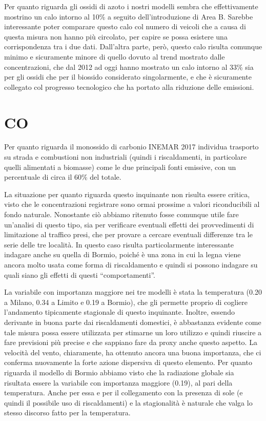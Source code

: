 \documentclass[a4paper]{report}
\begin{document}
Per quanto riguarda gli ossidi di azoto i nostri modelli sembra che effettivamente mostrino un calo intorno al 10\% a seguito dell'introduzione di Area B. Sarebbe interessante poter comparare questo calo col numero di veicoli che a causa di questa misura non hanno più circolato, per capire se possa esistere una corrispondenza tra i due dati. Dall'altra parte, però, questo calo risulta comunque minimo e sicuramente minore di quello dovuto al trend mostrato dalle concentrazioni, che dal 2012 ad oggi hanno mostrato un calo intorno al 33\% sia per gli ossidi che per il biossido considerato singolarmente, e che è sicuramente collegato col progresso tecnologico che ha portato alla riduzione delle emissioni.

\section{CO}
Per quanto riguarda il monossido di carbonio INEMAR 2017 individua trasporto su strada e combustioni non industriali (quindi i riscaldamenti, in particolare quelli alimentati a biomasse) come le due principali fonti emissive, con un percentuale di circa il 60\% del totale.

La situazione per quanto riguarda questo inquinante non risulta essere critica, visto che le concentrazioni registrare sono ormai prossime a valori riconducibili al fondo naturale. Nonostante ciò abbiamo ritenuto fosse comunque utile fare un'analisi di questo tipo, sia per verificare eventuali effetti dei provvedimenti di limitazione al traffico presi, che per provare a cercare eventuali differenze tra le serie delle tre località. In questo caso risulta particolarmente interessante indagare anche su quella di Bormio, poiché è una zona in cui la legna viene ancora molto usata come forma di riscaldamento e quindi si possono indagare su quali siano gli effetti di questi ``comportamenti''.

La variabile con importanza maggiore nei tre modelli è stata la temperatura (0.20 a Milano, 0.34 a Limito e 0.19 a Bormio), che gli permette proprio di cogliere l'andamento tipicamente stagionale di questo inquinante. Inoltre, essendo derivante in buona parte dai riscaldamenti domestici, è abbastanza evidente come tale misura possa essere utilizzata per stimarne un loro utilizzo e quindi riuscire a fare previsioni più precise e che sappiano fare da proxy anche questo aspetto.
La velocità del vento, chiaramente, ha ottenuto ancora una buona importanza, che ci conferma nuovamente la forte azione dispersiva di questo elemento.
Per quanto riguarda il modello di Bormio abbiamo visto che la radiazione globale sia risultata essere la variabile con importanza maggiore (0.19), al pari della temperatura. Anche per essa e per il collegamento con la presenza di sole (e quindi il possibile uso di riscaldamenti) e la stagionalità è naturale che valga lo stesso discorso fatto per la temperatura.
\end{document}
